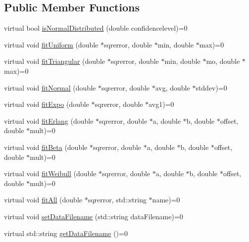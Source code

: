 \subsection*{Public Member Functions}
\begin{DoxyCompactItemize}
\item 
virtual bool \hyperlink{class_fitter__if_a53e98635fcdee314e8ade8089f41ddad}{is\-Normal\-Distributed} (double confidencelevel)=0
\item 
virtual void \hyperlink{class_fitter__if_adec53dfede4bdb31b175e57e6a2c2fc7}{fit\-Uniform} (double $\ast$sqrerror, double $\ast$min, double $\ast$max)=0
\item 
virtual void \hyperlink{class_fitter__if_a2bfc41c6a8044520aeafb2c5c71fe570}{fit\-Triangular} (double $\ast$sqrerror, double $\ast$min, double $\ast$mo, double $\ast$max)=0
\item 
virtual void \hyperlink{class_fitter__if_af95b4de00b7ed5d67b10d9ee458379bf}{fit\-Normal} (double $\ast$sqrerror, double $\ast$avg, double $\ast$stddev)=0
\item 
virtual void \hyperlink{class_fitter__if_a5ab5ac575b736bb720e6a40b334de5a3}{fit\-Expo} (double $\ast$sqrerror, double $\ast$avg1)=0
\item 
virtual void \hyperlink{class_fitter__if_aa46a5cd2d50d3cab34a719099e1058a1}{fit\-Erlang} (double $\ast$sqrerror, double $\ast$a, double $\ast$b, double $\ast$offset, double $\ast$mult)=0
\item 
virtual void \hyperlink{class_fitter__if_a686a7d540919b2e604df93b3049562d1}{fit\-Beta} (double $\ast$sqrerror, double $\ast$a, double $\ast$b, double $\ast$offset, double $\ast$mult)=0
\item 
virtual void \hyperlink{class_fitter__if_ae46e4cbb4354d6d06167aa498855d7ea}{fit\-Weibull} (double $\ast$sqrerror, double $\ast$a, double $\ast$b, double $\ast$offset, double $\ast$mult)=0
\item 
virtual void \hyperlink{class_fitter__if_a819a5ca8715ba4be30d2c7a3957aa467}{fit\-All} (double $\ast$sqrerror, std\-::string $\ast$name)=0
\item 
virtual void \hyperlink{class_fitter__if_aa2d2f13548a09a2f727a4190a6b9c2dd}{set\-Data\-Filename} (std\-::string data\-Filename)=0
\item 
virtual std\-::string \hyperlink{class_fitter__if_a3c6926020b1224a960890fe308abcc86}{get\-Data\-Filename} ()=0
\end{DoxyCompactItemize}


